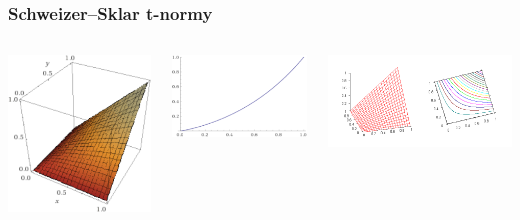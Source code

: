 \documentclass{beamer}
\begin{document}
\begin{frame}
\frametitle{Schweizer–Sklar t-normy}
\begin{columns}
\begin{minipage}[c][0.4\textheight][c]{\linewidth}
  \centering
  \includegraphics[width=0.5\linewidth]{SS-0-5}
\end{minipage}
\begin{minipage}[c][0.4\textheight][c]{\linewidth}
  \centering
  \includegraphics[width=0.7\linewidth]{SS-0-5-diag}
\end{minipage}
\begin{minipage}[c][0.4\textheight][c]{\linewidth}
  \centering
  \includegraphics[width=1.1\linewidth]{ProductTnorm}

\end{minipage}
\end{columns}
\end{frame}
\end{document}
